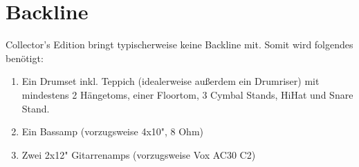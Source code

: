 \section*{Backline}

Collector's Edition bringt typischerweise keine Backline mit. Somit wird folgendes
benötigt:

\begin{enumerate}
\item Ein Drumset inkl. Teppich (idealerweise außerdem ein Drumriser) mit
mindestens 2 Hängetoms, einer Floortom, 3 Cymbal Stands, HiHat und Snare Stand.
\item Ein Bassamp (vorzugsweise 4x10", 8 Ohm)
\item Zwei 2x12" Gitarrenamps (vorzugsweise Vox AC30 C2)
\end{enumerate}
